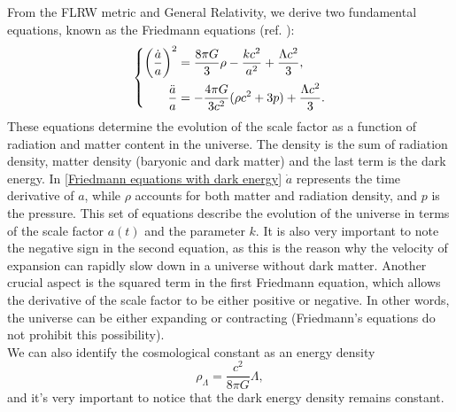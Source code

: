 From the FLRW metric and General Relativity, we derive two fundamental equations, known as the Friedmann equations (ref. \cite{Friedmann-1922}):
\begin{equation} \label{Friedmann equations with dark energy}
    \left\{
    \begin{aligned}
        \left( \frac{\dot{a}}{a} \right)^2 &= \frac{8\pi G}{3} \rho - \frac{k c^2}{a^2} + \frac{\Lambda c^2}{3}, \\  
        \frac{\Ddot{a}}{a} &= - \frac{4\pi G}{3c^2}(\rho c^2 + 3p) + \frac{\Lambda c^2}{3}.
    \end{aligned}
    \right.
\end{equation}
These equations determine the evolution of the scale factor as a function of radiation and matter content in the universe. The density is the sum of radiation density, matter density (baryonic and dark matter) and the last term is the dark energy.
In \eqref{Friedmann equations with dark energy} $\dot{a}$ represents the time derivative of $a$, while $\rho$ accounts for both matter and radiation density, and $p$ is the pressure. This set of equations describe the evolution of the universe in terms of the scale factor $a(t)$ and the parameter $k$. It is also very important to note the negative sign in the second equation, as this is the reason why the velocity of expansion can rapidly slow down in a universe without dark matter. Another crucial aspect is the squared term in the first Friedmann equation, which allows the derivative of the scale factor to be either positive or negative. In other words, the universe can be either expanding or contracting (Friedmann's equations do not prohibit this possibility).\\
We can also identify the cosmological constant as an energy density
\begin{equation}\label{dark energy}
    \rho_\Lambda = \frac{c^2}{8 \pi G} \Lambda,
\end{equation}  
and it's very important to notice that the dark energy density remains constant.\\

